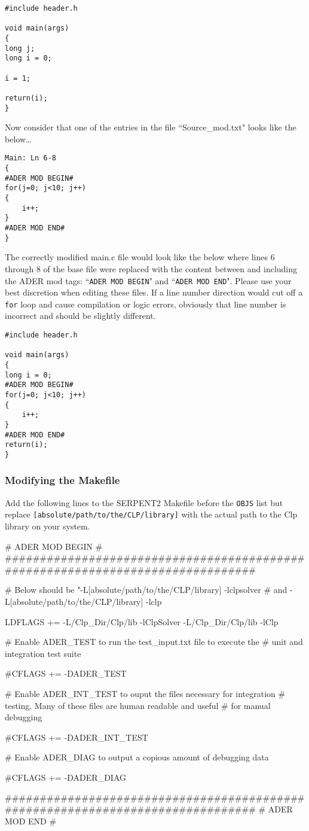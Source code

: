 \begin{lstlisting}
#include header.h

void main(args)
{
long j;
long i = 0;

i = 1;

return(i);
}
\end{lstlisting}

Now consider that one of the entries in the file
``Source\_mod.txt" looks like the below\ldots

\begin{lstlisting}
Main: Ln 6-8
{
#ADER MOD BEGIN#
for(j=0; j<10; j++)
{
    i++;
}
#ADER MOD END#
}
\end{lstlisting}

The correctly modified main.c file would look like the below where lines 6 
through 8 of the base file were replaced with the content between and including
the ADER mod tags: ``\texttt{ADER MOD BEGIN}" and ``\texttt{ADER MOD END}".
Please use your best discretion when editing these files. If a line number
direction would cut off a \texttt{for} loop and cause compilation or logic
errors, obviously that line number is incorrect and should be slightly
different.

\begin{lstlisting}
#include header.h

void main(args)
{
long i = 0;
#ADER MOD BEGIN#
for(j=0; j<10; j++)
{
    i++;
}
#ADER MOD END#
return(i);
}
\end{lstlisting}

\subsubsection{Modifying the Makefile}\label{sssec:makefile}
Add the following lines to the SERPENT2 Makefile before the \texttt{OBJS} list
but replace \texttt{[absolute/path/to/the/CLP/library]} with the actual path
to the Clp library on your system.

\begin{li}
# ADER MOD BEGIN #
###############################################################################

# Below should be "-L[absolute/path/to/the/CLP/library] -lclpsolver
#     and -L[absolute/path/to/the/CLP/library] -lclp

LDFLAGS += -L/Clp_Dir/Clp/lib -lClpSolver -L/Clp_Dir/Clp/lib -lClp

# Enable ADER_TEST to run the test_input.txt file to execute the 
#     unit and integration test suite

#CFLAGS += -DADER_TEST

# Enable ADER_INT_TEST to ouput the files necessary for integration
#     testing. Many of these files are human readable and useful 
#     for manual debugging

#CFLAGS += -DADER_INT_TEST

# Enable ADER_DIAG to output a copious amount of debugging data

#CFLAGS += -DADER_DIAG

###############################################################################
# ADER MOD END #
\end{li}

